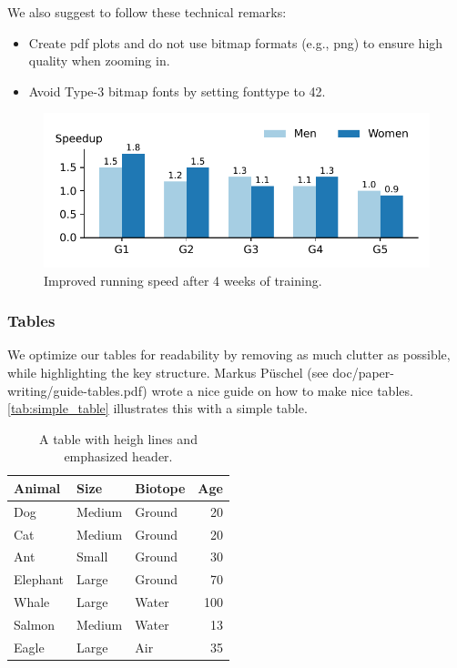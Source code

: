 \documentclass[a4paper]{article}
\newenvironment{draftonly}{}{}
\newcommand{\ra}[1]{\renewcommand{\arraystretch}{#1}}
\begin{document}
\begin{draftonly}
\noindent
We also suggest to follow these technical remarks:
\begin{itemize}
  \item Create pdf plots and do not use bitmap formats (e.g., png) to
	ensure high quality when zooming in.
  \item Avoid Type-3 bitmap fonts by
	setting fonttype to 42.
\end{itemize}

\begin{figure}
\includegraphics[width=\columnwidth]{plots/speedup}
\caption{Improved running speed after 4 weeks of training.
}
\label{fig:speedup}
\end{figure}

\subsubsection{Tables} We optimize our tables for readability by removing as
much clutter as possible, while highlighting the key structure. Markus Püschel
(see doc/paper-writing/guide-tables.pdf) wrote a nice guide on how to make nice
tables. \autoref{tab:simple_table} illustrates this with a simple
table.

\begin{table}
\ra{1.2}
\centering
\begin{tabular}{l l l r}
  \toprule
  \textbf{Animal} & \textbf{Size} & \textbf{Biotope} & \textbf{Age}\\
  \midrule
  Dog & Medium & Ground & 20\\
  Cat & Medium & Ground &20 \\
  Ant & Small & Ground & 30 \\
  Elephant & Large & Ground & 70\\
  Whale & Large & Water & 100\\
  Salmon & Medium & Water & 13 \\
  Eagle & Large & Air & 35 \\
  \bottomrule
\end{tabular}
\vspace{1em}
\caption{A table with heigh lines and emphasized header.}
\label{tab:simple_table}
\end{table}


\end{draftonly}
\end{document}
